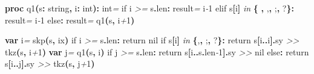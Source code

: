 \documentclass[
  12pt,
]{book}
\newenvironment{Shaded}{}{}
\newcommand{\CharTok}[1]{\textcolor[rgb]{0.25,0.44,0.63}{#1}}
\newcommand{\CommentTok}[1]{\textcolor[rgb]{0.38,0.63,0.69}{\textit{#1}}}
\newcommand{\DataTypeTok}[1]{\textcolor[rgb]{0.56,0.13,0.00}{#1}}
\newcommand{\DecValTok}[1]{\textcolor[rgb]{0.25,0.63,0.44}{#1}}
\newcommand{\FloatTok}[1]{\textcolor[rgb]{0.25,0.63,0.44}{#1}}
\newcommand{\KeywordTok}[1]{\textcolor[rgb]{0.00,0.44,0.13}{\textbf{#1}}}
\newcommand{\NormalTok}[1]{#1}
\newcommand{\OtherTok}[1]{\textcolor[rgb]{0.00,0.44,0.13}{#1}}
\newcommand{\StringTok}[1]{\textcolor[rgb]{0.25,0.44,0.63}{#1}}
\begin{document}
\begin{Shaded}
\begin{Highlighting}[]
  \KeywordTok{proc }\StringTok{q1}\KeywordTok{(}\NormalTok{s}\KeywordTok{:} \DataTypeTok{string}\KeywordTok{,}\NormalTok{ i}\KeywordTok{:} \DataTypeTok{int}\KeywordTok{):} \DataTypeTok{int}\CommentTok{=}
    \DataTypeTok{if}\NormalTok{ i }\CommentTok{\textgreater{}=}\NormalTok{ s}\KeywordTok{.}\DataTypeTok{len}\KeywordTok{:} \OtherTok{result}\CommentTok{=}\NormalTok{ i}\CommentTok{{-}}\DecValTok{1}
    \DataTypeTok{elif}\NormalTok{ s}\KeywordTok{[}\NormalTok{i}\KeywordTok{]} \CommentTok{in} \KeywordTok{\{}\CharTok{\textquotesingle{} \textquotesingle{}}\KeywordTok{,} \CharTok{\textquotesingle{},\textquotesingle{}}\KeywordTok{,} \CharTok{\textquotesingle{};\textquotesingle{}}\KeywordTok{,} \CharTok{\textquotesingle{}?\textquotesingle{}}\KeywordTok{\}:} \OtherTok{result}\CommentTok{=}\NormalTok{ i}\CommentTok{{-}}\DecValTok{1}
    \DataTypeTok{else}\KeywordTok{:} \OtherTok{result}\CommentTok{=} \DataTypeTok{q1}\KeywordTok{(}\NormalTok{s}\KeywordTok{,}\NormalTok{ i}\CommentTok{+}\DecValTok{1}\KeywordTok{)}
  
  \KeywordTok{var}\NormalTok{ i}\CommentTok{=} \DataTypeTok{skp}\KeywordTok{(}\NormalTok{s}\KeywordTok{,}\NormalTok{ ix}\KeywordTok{)}
  \DataTypeTok{if}\NormalTok{ i }\CommentTok{\textgreater{}=}\NormalTok{ s}\KeywordTok{.}\DataTypeTok{len}\KeywordTok{:} \DataTypeTok{return} \FloatTok{nil}
  \DataTypeTok{if}\NormalTok{ s}\KeywordTok{[}\NormalTok{i}\KeywordTok{]} \CommentTok{in} \KeywordTok{\{}\CharTok{\textquotesingle{},\textquotesingle{}}\KeywordTok{,} \CharTok{\textquotesingle{};\textquotesingle{}}\KeywordTok{,} \CharTok{\textquotesingle{}?\textquotesingle{}}\KeywordTok{\}:} \DataTypeTok{return}\NormalTok{ s}\KeywordTok{[}\NormalTok{i}\KeywordTok{..}\NormalTok{i}\KeywordTok{].}\DataTypeTok{sy} \CommentTok{\textgreater{}\textgreater{}} \DataTypeTok{tkz}\KeywordTok{(}\NormalTok{s}\KeywordTok{,}\NormalTok{ i}\CommentTok{+}\DecValTok{1}\KeywordTok{)}
  \KeywordTok{var}\NormalTok{ j}\CommentTok{=} \DataTypeTok{q1}\KeywordTok{(}\NormalTok{s}\KeywordTok{,}\NormalTok{ i}\KeywordTok{)}
  \DataTypeTok{if}\NormalTok{ j }\CommentTok{\textgreater{}=}\NormalTok{ s}\KeywordTok{.}\DataTypeTok{len}\KeywordTok{:} \DataTypeTok{return}\NormalTok{ s}\KeywordTok{[}\NormalTok{i}\KeywordTok{..}\NormalTok{s}\KeywordTok{.}\DataTypeTok{len}\CommentTok{{-}}\DecValTok{1}\KeywordTok{].}\DataTypeTok{sy} \CommentTok{\textgreater{}\textgreater{}} \FloatTok{nil}
  \DataTypeTok{else}\KeywordTok{:} \DataTypeTok{return}\NormalTok{ s}\KeywordTok{[}\NormalTok{i}\KeywordTok{..}\NormalTok{j}\KeywordTok{].}\DataTypeTok{sy} \CommentTok{\textgreater{}\textgreater{}} \DataTypeTok{tkz}\KeywordTok{(}\NormalTok{s}\KeywordTok{,}\NormalTok{ j}\CommentTok{+}\DecValTok{1}\KeywordTok{)}


\end{Highlighting}
\end{Shaded}
\end{document}
